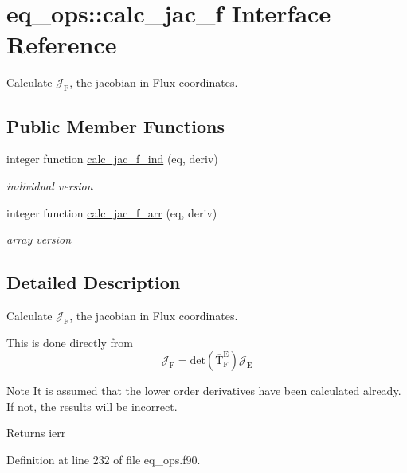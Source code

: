 \hypertarget{interfaceeq__ops_1_1calc__jac__f}{}\section{eq\+\_\+ops\+:\+:calc\+\_\+jac\+\_\+f Interface Reference}
\label{interfaceeq__ops_1_1calc__jac__f}


Calculate $\mathcal{J}_\text{F}$, the jacobian in Flux coordinates.  


\subsection*{Public Member Functions}
\begin{DoxyCompactItemize}
\item 
integer function \hyperlink{interfaceeq__ops_1_1calc__jac__f_a265d2f943889de6632d835c5eeafc639}{calc\+\_\+jac\+\_\+f\+\_\+ind} (eq, deriv)
\begin{DoxyCompactList}\small\item\em individual version \end{DoxyCompactList}\item 
integer function \hyperlink{interfaceeq__ops_1_1calc__jac__f_a0ede3ce8b9c24ad484b96f197e191d7b}{calc\+\_\+jac\+\_\+f\+\_\+arr} (eq, deriv)
\begin{DoxyCompactList}\small\item\em array version \end{DoxyCompactList}\end{DoxyCompactItemize}


\subsection{Detailed Description}
Calculate $\mathcal{J}_\text{F}$, the jacobian in Flux coordinates. 

This is done directly from \[ \mathcal{J}_\text{F} = \text{det}\left(\overline{\text{T}}_\text{F}^\text{E}\right) \mathcal{J}_\text{E} \]

\begin{DoxyNote}{Note}
It is assumed that the lower order derivatives have been calculated already. If not, the results will be incorrect.
\end{DoxyNote}
\begin{DoxyReturn}{Returns}
ierr 
\end{DoxyReturn}


Definition at line 232 of file eq\+\_\+ops.\+f90.



